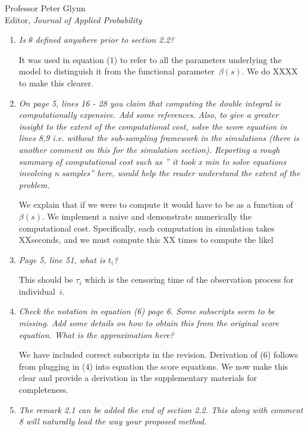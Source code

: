 \documentclass[11pt]{letter} %
\begin{document}
\begin{letter}{Professor
	Peter Glynn\\
	Editor, {\em Journal of Applied Probability}}
\begin{enumerate}
\item  {\it Is $\theta$ defined anywhere prior to section 2.2?}

\vspace{5mm}
It was used in equation (1) to refer to all the parameters underlying the model to distinguish it from the functional parameter~$\beta (s)$.
We do XXXX to make this clearer.
\vspace{5mm}

\item {\it On page 5, lines 16 - 28 you claim that computing the double integral is computationally expensive. Add some references. Also, to give a greater insight to the extent of the computational cost, solve the score equation in lines 8,9 i.e. without the sub-sampling framework in the simulations (there is another comment on this for the simulation section). Reporting a rough summary of computational cost such as ” it took x min to solve equations involving n samples” here, would help the reader understand
the extent of the problem.}

\vspace{5mm}
We explain that if we were to compute it would have to be as a function of $\beta(s)$.  We implement a naive and demonstrate numerically the computational cost.  Specifically, each computation in simulation takes XXseconds, and we must compute this XX times to compute the likel
\vspace{5mm}

\item {\it Page 5, line 51, what is $t_i$?}

\vspace{5mm}
This should be $\tau_i$ which is the censoring time of the observation process for individual~$i$.
\vspace{5mm}

\item {\it Check the notation in equation (6) page 6. Some subscripts seem to be missing. Add some details on how to obtain this from the original score
equation. What is the approximation here?}

\vspace{5mm}
We have included correct subscripts in the revision.  Derivation of (6) follows from plugging in (4) into equation the score equations.  We now make this clear and provide a derivation in the supplementary materials for completeness.
\vspace{5mm}

\item{\it The remark 2.1 can be added the end of section 2.2. This along with
comment 8 will naturally lead the way your proposed method.}


\end{enumerate}
\end{letter}
\end{document}

